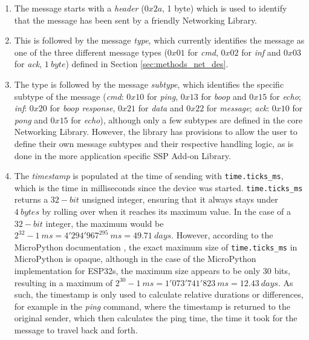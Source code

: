 \begin{enumerate}
    \item The message starts with a \textit{header} ($0x2a$, 1 byte) which is used to identify that the message has been sent by a friendly Networking Library.
    \item This is followed by the message \textit{type}, which currently identifies the message as one of the three different message types ($0x01$ for \textit{cmd}, $0x02$ for \textit{inf} and $0x03$ for \textit{ack}, $1\ byte$) defined in Section \ref{sec:methods_net_des}.
    \item The type is followed by the message \textit{subtype}, which identifies the specific subtype of the message (\textit{cmd}: $0x10$ for \textit{ping}, $0x13$ for \textit{boop} and $0x15$ for \textit{echo}; \textit{inf}: $0x20$ for \textit{boop response}, $0x21$ for \textit{data} and $0x22$ for \textit{message}; \textit{ack}: $0x10$ for \textit{pong} and $0x15$ for \textit{echo}), although only a few subtypes are defined in the core Networking Library. However, the library has provisions to allow the user to define their own message subtypes and their respective handling logic, as is done in the more application specific SSP Add-on Library.
    \item The \textit{timestamp} is populated at the time of sending with \verb!time.ticks_ms!, which is the time in milliseconds since the device was started. \verb!time.ticks_ms! returns a $32-bit$ unsigned integer, ensuring that it always stays under $4\ bytes$ by rolling over when it reaches its maximum value. In the case of a $32-bit$ integer, the maximum would be $2^{32} -1\ ms = 4'294'967^295\ ms = 49.71\ days$. However, according to the MicroPython documentation \citep{micropython_micropython_2025-2}, the exact maximum size of \verb!time.ticks_ms! in MicroPython is opaque, although in the case of the MicroPython implementation for ESP32s, the maximum size appears to be only 30 bits, resulting in a maximum of $2^{30}-1\ ms=1'073'741'823\ ms = 12.43\ days$. As such, the timestamp is only used to calculate relative durations or differences, for example in the \textit{ping} command, where the timestamp is returned to the original sender, which then calculates the ping time, the time it took for the message to travel back and forth.

\end{enumerate}
